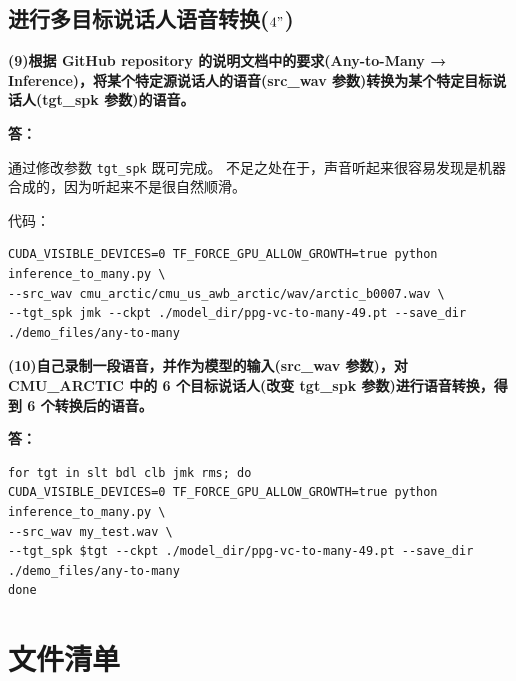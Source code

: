 \documentclass[degree=project,degree-type=project,cjk-font=noto]{thuthesis}
\begin{document}
\section{进行多目标说话人语音转换($4"$)}

\textbf{(9)根据 GitHub repository 的说明文档中的要求(Any-to-Many → Inference)，将某个特定源说话人的语音(src\_wav 参数)转换为某个特定目标说话人(tgt\_spk 参数)的语音。}

\textbf{答：}


通过修改参数 \texttt{tgt\_spk} 既可完成。
不足之处在于，声音听起来很容易发现是机器合成的，因为听起来不是很自然顺滑。

代码：
  \begin{verbatim}
CUDA_VISIBLE_DEVICES=0 TF_FORCE_GPU_ALLOW_GROWTH=true python inference_to_many.py \
--src_wav cmu_arctic/cmu_us_awb_arctic/wav/arctic_b0007.wav \
--tgt_spk jmk --ckpt ./model_dir/ppg-vc-to-many-49.pt --save_dir ./demo_files/any-to-many
\end{verbatim}


\textbf{(10)自己录制一段语音，并作为模型的输入(src\_wav 参数)，对 CMU\_ARCTIC 中的 6 个目标说话人(改变 tgt\_spk 参数)进行语音转换，得到 6 个转换后的语音。}

\textbf{答：}

  \begin{verbatim}
for tgt in slt bdl clb jmk rms; do 
CUDA_VISIBLE_DEVICES=0 TF_FORCE_GPU_ALLOW_GROWTH=true python inference_to_many.py \
--src_wav my_test.wav \
--tgt_spk $tgt --ckpt ./model_dir/ppg-vc-to-many-49.pt --save_dir ./demo_files/any-to-many
done
\end{verbatim}



\backmatter


\appendix

\chapter{文件清单}
\end{document}
